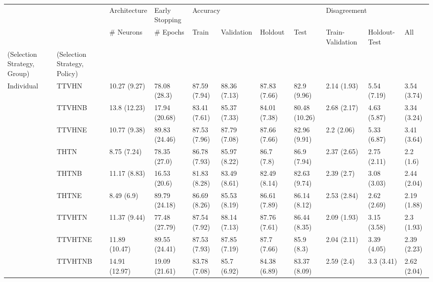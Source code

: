 \begin{table}
\centering
\label{tab:no_premature_early_stopping}
\begin{tabular}{lllllllllll}
\toprule
       &         &   Architecture & Early Stopping & \multicolumn{4}{l}{Accuracy} & \multicolumn{3}{l}{Disagreement} \\
       &         &      \# Neurons &       \# Epochs &          Train &    Validation &       Holdout &           Test & Train-Validation & Holdout-Test &          All \\
(Selection Strategy, Group) & (Selection Strategy, Policy) &                &                &                &               &               &                &                  &              &              \\
\midrule
Individual & TTVHN &   10.27 (9.27) &   78.08 (28.3) &   87.59 (7.94) &  88.36 (7.13) &  87.83 (7.66) &    82.9 (9.96) &      2.14 (1.93) &  5.54 (7.19) &  3.54 (3.74) \\
       & TTVHNB &   13.8 (12.23) &  17.94 (20.68) &   83.41 (7.61) &  85.37 (7.33) &  84.01 (7.38) &  80.48 (10.26) &      2.68 (2.17) &  4.63 (5.87) &  3.34 (3.24) \\
       & TTVHNE &   10.77 (9.38) &  89.83 (24.46) &   87.53 (7.96) &  87.79 (7.08) &  87.66 (7.66) &   82.96 (9.91) &       2.2 (2.06) &  5.33 (6.87) &  3.41 (3.64) \\
       & THTN &    8.75 (7.24) &   78.35 (27.0) &   86.78 (7.93) &  85.97 (8.22) &    86.7 (7.8) &    86.9 (7.94) &      2.37 (2.65) &  2.75 (2.11) &    2.2 (1.6) \\
       & THTNB &   11.17 (8.83) &   16.53 (20.6) &   81.83 (8.28) &  83.49 (8.61) &  82.49 (8.14) &   82.63 (9.74) &       2.39 (2.7) &  3.08 (3.03) &  2.44 (2.04) \\
       & THTNE &     8.49 (6.9) &  89.79 (24.18) &   86.69 (8.26) &  85.53 (8.19) &  86.61 (7.89) &   86.14 (8.12) &      2.53 (2.84) &  2.62 (2.69) &  2.19 (1.88) \\
       & TTVHTN &   11.37 (9.44) &  77.48 (27.79) &   87.54 (7.92) &  88.14 (7.13) &  87.76 (7.61) &   86.44 (8.35) &      2.09 (1.93) &  3.15 (3.58) &   2.3 (1.93) \\
       & TTVHTNE &  11.89 (10.47) &  89.55 (24.41) &   87.53 (7.93) &  87.85 (7.19) &   87.7 (7.66) &     85.9 (8.3) &      2.04 (2.11) &  3.39 (4.05) &  2.39 (2.23) \\
       & TTVHTNB &  14.91 (12.97) &  19.09 (21.61) &   83.78 (7.08) &   85.7 (6.92) &  84.38 (6.89) &   83.37 (8.09) &       2.59 (2.4) &   3.3 (3.41) &  2.62 (2.04) \\

\end{tabular}
\end{table}
